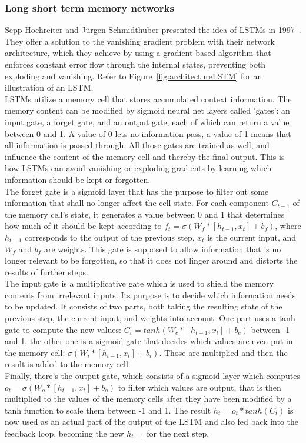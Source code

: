 \documentclass[
a4paper,
pagesize,
pdftex,
12pt,
twoside, %
BCOR=5mm, %
ngerman,
fleqn,
final,
]{scrartcl}
\begin{document}
	\subsubsection{Long short term memory networks}\label{LSTM}
	Sepp Hochreiter and Jürgen Schmidthuber presented the idea of LSTMs in 1997~\cite{Hochreiter.1997}. They offer a solution to the vanishing gradient problem with their network architecture, which they achieve by using a gradient-based algorithm that enforces constant error flow through the internal states, preventing both exploding and vanishing. Refer to Figure~\ref{fig:architectureLSTM} for an illustration of an LSTM.\\
	LSTMs utilize a memory cell that stores accumulated context information. The memory content can be modified by sigmoid neural net layers called 'gates': an input gate, a forget gate, and an output gate, each of which can return a value between 0 and 1. A value of 0 lets no information pass, a value of 1 means that all information is passed through. All those gates are trained as well, and influence the content of the memory cell and thereby the final output. This is how LSTMs can avoid vanishing or exploding gradients by learning which information should be kept or forgotten.\\
	The forget gate is a sigmoid layer that has the purpose to filter out some information that shall no longer affect the cell state. For each component $C_{t-1}$ of the memory cell's state, it generates a value between 0 and 1 that determines how much of it should be kept according to $f_t = \sigma (W_f * [h_{t-1}, x_t] + b_f)$, where $h_{t-1}$ corresponds to the output of the previous step, $x_t$ is the current input, and $W_f$ and $b_f$ are weights. This gate is supposed to allow information that is no longer relevant to be forgotten, so that it does not linger around and distorts the results of further steps.\\
	The input gate is a multiplicative gate which is used to shield the memory contents from irrelevant inputs. Its purpose is to decide which information needs to be updated. It consists of two parts, both taking the resulting state of the previous step, the current input, and weights into account. One part uses a tanh gate to compute the new values: $C_t = tanh (W_c * [h_{t-1} , x_t] + b_c)$ between -1 and 1, the other one is a sigmoid gate that decides which values are even put in the memory cell: $\sigma (W_i * [h_{t-1}, x_t] + b_i)$. Those are multiplied and then the result is added to the memory cell.\\
	Finally, there's the output gate, which consists of a sigmoid layer which computes $o_t = \sigma (W_o * [h_{t-1}, x_t] + b_o)$ to filter which values are output, that is then multiplied to the values of the memory cells after they have been modified by a tanh function to scale them between -1 and 1. The result $h_t = o_t * tanh(C_t)$ is now used as an actual part of the output of the LSTM and also fed back into the feedback loop, becoming the new $h_{t-1}$ for the next step.	
	
\end{document}
